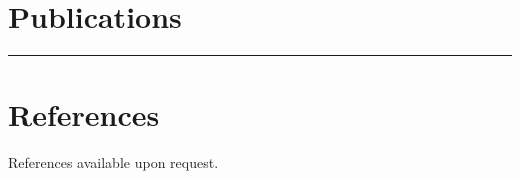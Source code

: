 \documentclass[10pt]{article}%
\begin{document}
    \section*{\faBook{} Publications}
    \nocite{*}
    
    \par\noindent\rule{\textwidth}{0.4pt}
    \section*{\faUserPlus{} References}
    References available upon request.
\end{document}
